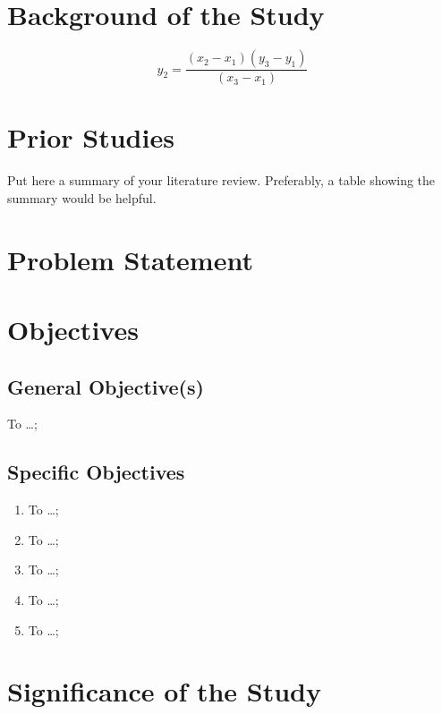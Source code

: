 \section{Background of the Study}

	\[y_{2} = \frac{(x_{2} - x_{1}) (y_{3} - y_{1})}{(x_{3} - x_{1})}
\]


\section{Prior Studies}

Put here a summary of your literature review.  Preferably, a table showing the summary would be helpful. \blindtext



\section{Problem Statement}
\blindtext



\section{Objectives}
\subsection{General Objective(s)}
To \ldots;

\subsection{Specific Objectives}

\begin{enumerate}
	\item To  \ldots;
	
	\item To  \ldots;
	
	\item To  \ldots;
	
	\item To  \ldots;
	
	\item To  \ldots;
\end{enumerate}



\section{Significance of the Study}

